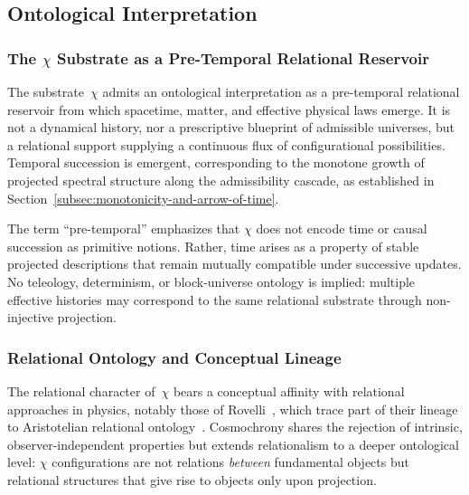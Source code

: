 \subsection{Ontological Interpretation}
  \label{subsec:chi_ontology}

  \subsubsection*{The \texorpdfstring{$\chi$}{χ} Substrate as a Pre-Temporal Relational Reservoir}
    \label{subsubsec:the-chi-substrate-as-a-pre-temporal-relational-reservoir}

    The substrate~$\chi$ admits an ontological interpretation as a pre-temporal
    relational reservoir from which spacetime, matter, and effective physical
    laws emerge.
    It is not a dynamical history, nor a prescriptive blueprint of admissible
    universes, but a relational support supplying a continuous flux of
    configurational possibilities.
    Temporal succession is emergent, corresponding to the monotone growth of
    projected spectral structure along the admissibility cascade, as established
    in Section~\ref{subsec:monotonicity-and-arrow-of-time}.

    The term ``pre-temporal'' emphasizes that $\chi$ does not encode time or
    causal succession as primitive notions.
    Rather, time arises as a property of stable projected descriptions that
    remain mutually compatible under successive updates.
    No teleology, determinism, or block-universe ontology is implied: multiple
    effective histories may correspond to the same relational substrate through
    non-injective projection.

  \subsubsection*{Relational Ontology and Conceptual Lineage}
    \label{subsubsec:relational-ontology-and-conceptual-lineage}

    The relational character of~$\chi$ bears a conceptual affinity with
    relational approaches in physics, notably those of
    Rovelli~\cite{Rovelli1996,Rovelli2004}, which trace part of their lineage
    to Aristotelian relational ontology~\cite{AristotleCategories,Shields2016}.
    Cosmochrony shares the rejection of intrinsic, observer-independent
    properties but extends relationalism to a deeper ontological level:
    $\chi$ configurations are not relations \emph{between} fundamental objects
    but relational structures that give rise to objects only upon projection.

